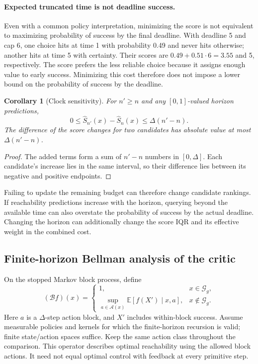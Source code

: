 \documentclass{article}
\newcommand{\EE}{\mathbb E}
\newcommand{\Aset}{\mathcal A}
\newtheorem{corollary}[theorem]{Corollary}
\theoremstyle{definition}
\theoremstyle{remark}
\begin{document}
\paragraph{Expected truncated time is not deadline success.}
Even with a common policy interpretation, minimizing the score is not equivalent to
maximizing probability of success by the final deadline.
With deadline 5 and cap 6, one choice hits at time 1 with probability 0.49 and never
hits otherwise; another hits at time 5 with certainty.
Their scores are $0.49+0.51\cdot6=3.55$ and 5, respectively.
The score prefers the less reliable choice because it assigns enough value to early success.
Minimizing this cost therefore does not impose a lower bound on the probability of
success by the deadline.

\begin{corollary}[Clock sensitivity]
\label{cor:clock}
For $n'\ge n$ and any $[0,1]$-valued horizon predictions,
\[
 0\le \widehat S_{n'}(x)-\widehat S_n(x)\le\Delta(n'-n).
\]
The difference of the score changes for two candidates has absolute value at most
$\Delta(n'-n)$.
\end{corollary}
\begin{proof}
The added terms form a sum of $n'-n$ numbers in $[0,\Delta]$.
Each candidate's increase lies in the same interval, so their difference lies between
its negative and positive endpoints.
\end{proof}
Failing to update the remaining budget can therefore change candidate rankings.
If reachability predictions increase with the horizon, querying beyond the available
time can also overstate the probability of success by the actual deadline.
Changing the horizon can additionally change the score IQR and its effective weight
in the combined cost.

\subsection{Finite-horizon Bellman analysis of the critic}
\label{app:critic-proof}
On the stopped Markov block process, define
\begin{equation}
 (\mathcal Bf)(x)=
 \begin{cases}
  1,&x\in\mathcal G_g,\\
  \sup_{a\in\Aset(x)}\EE[f(X')\mid x,a],&x\notin\mathcal G_g .
 \end{cases}
 \label{eq:bellman}
\end{equation}
Here $a$ is a $\Delta$-step action block, and $X'$ includes within-block success.
Assume measurable policies and kernels for which the finite-horizon recursion is
valid; finite state/action spaces suffice. Keep the same action class throughout the comparison.
This operator describes optimal reachability using the allowed block actions.
It need not equal optimal control with feedback at every primitive step.
\end{document}
